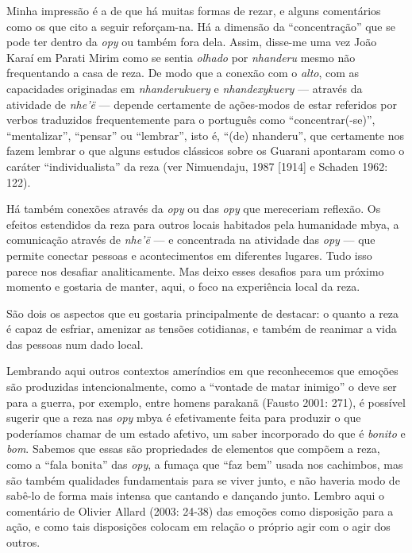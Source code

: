Minha impressão é a de que há muitas formas de rezar, e alguns
comentários como os que cito a seguir reforçam-na. Há a dimensão da
``concentração'' que se pode ter dentro da \emph{opy} ou também fora
dela. Assim, disse-me uma vez João Karaí em Parati Mirim como se sentia
\emph{olhado} por \emph{nhanderu} mesmo não frequentando a casa de reza.
De modo que a conexão com o \emph{alto}, com as capacidades originadas
em \emph{nhanderukuery} e \emph{nhandexykuery} --- através da atividade
de \emph{nhe'ë} --- depende certamente de ações-modos de estar referidos
por verbos traduzidos frequentemente para o português como
``concentrar(-se)'', ``mentalizar'', ``pensar'' ou ``lembrar'', isto é,
``(de) nhanderu'', que certamente nos fazem lembrar o que alguns estudos
clássicos sobre os Guarani apontaram como o caráter ``individualista''
da reza (ver Nimuendaju, 1987 {[}1914{]} e Schaden 1962: 122).

Há também conexões através da \emph{opy} ou das \emph{opy} que
mereceriam reflexão. Os efeitos estendidos da reza para outros locais
habitados pela humanidade mbya, a comunicação através de \emph{nhe'ë}
--- e concentrada na atividade das \emph{opy} --- que permite conectar
pessoas e acontecimentos em diferentes lugares. Tudo isso parece nos
desafiar analiticamente. Mas deixo esses desafios para um próximo
momento e gostaria de manter, aqui, o foco na experiência local da reza.

São dois os aspectos que eu gostaria principalmente de destacar: o
quanto a reza é capaz de esfriar, amenizar as tensões cotidianas, e
também de reanimar a vida das pessoas num dado local.

Lembrando aqui outros contextos ameríndios em que reconhecemos que
emoções são produzidas intencionalmente, como a ``vontade de matar
inimigo'' o deve ser para a guerra, por exemplo, entre homens parakanã
(Fausto 2001: 271), é possível sugerir que a reza nas \emph{opy} mbya é
efetivamente feita para produzir o que poderíamos chamar de um estado
afetivo, um saber incorporado do que é \emph{bonito} e \emph{bom}.
Sabemos que essas são propriedades de elementos que compõem a reza, como
a ``fala bonita'' das \emph{opy}, a fumaça que ``faz bem'' usada nos
cachimbos, mas são também qualidades fundamentais para se viver junto, e
não haveria modo de sabê-lo de forma mais intensa que cantando e
dançando junto. Lembro aqui o comentário de Olivier Allard (2003: 24-38)
das emoções como disposição para a ação, e como tais disposições colocam
em relação o próprio agir com o agir dos outros.

